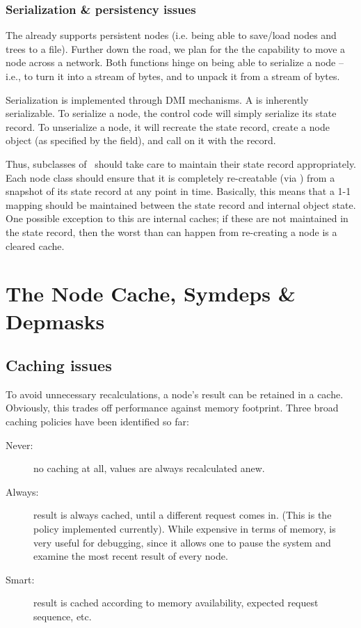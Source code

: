 \subsection{Serialization \& persistency issues}

  The  already supports persistent nodes (i.e. being able to
  save/load nodes and trees to a file). Further down the road, we plan for the
  the capability to move a node across a network. Both functions hinge on being
  able to serialize a node -- i.e., to turn it into a stream of bytes, and to
  unpack it from a stream of bytes.

  Serialization is implemented through DMI mechanisms. A  is
  inherently serializable. To serialize a node, the control code will simply
  serialize its state record. To unserialize a node, it will recreate the state
  record, create a node object (as specified by the  field), and call
   on it with the record. 

  Thus, subclasses of \Node\ should take care to maintain their state record
  appropriately. Each node class should ensure that it is completely
  re-creatable (via ) from a snapshot of its state record at any
  point in time. Basically, this means that a 1-1 mapping should be maintained
  between the state record and internal object state. One possible exception to
  this are internal caches; if these are not maintained in the state record,
  then the worst than can happen from re-creating a node is a cleared cache.
  
\chapter{The Node Cache, Symdeps \& Depmasks}

\section{Caching issues}

  To avoid unnecessary recalculations, a node's result can be retained in a
  cache. Obviously, this trades off performance against memory footprint. Three
  broad caching policies have been identified so far:

  \begin{description}
  
  \item[Never:] no caching at all, values are always recalculated anew. 
   
  \item[Always:] result is always cached, until a different request comes in.
    (This is the policy implemented currently). While expensive in terms of
    memory, is very useful for debugging, since it allows one to pause the
    system and examine the most recent result of every node.

  \item[Smart:] result is cached according to memory availability, expected
    request sequence, etc.

  \end{description}
  
